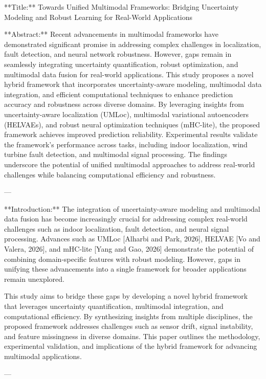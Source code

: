 **Title:**  
Towards Unified Multimodal Frameworks: Bridging Uncertainty Modeling and Robust Learning for Real-World Applications  

**Abstract:**  
Recent advancements in multimodal frameworks have demonstrated significant promise in addressing complex challenges in localization, fault detection, and neural network robustness. However, gaps remain in seamlessly integrating uncertainty quantification, robust optimization, and multimodal data fusion for real-world applications. This study proposes a novel hybrid framework that incorporates uncertainty-aware modeling, multimodal data integration, and efficient computational techniques to enhance prediction accuracy and robustness across diverse domains. By leveraging insights from uncertainty-aware localization (UMLoc), multimodal variational autoencoders (HELVAEs), and robust neural optimization techniques (mHC-lite), the proposed framework achieves improved prediction reliability. Experimental results validate the framework's performance across tasks, including indoor localization, wind turbine fault detection, and multimodal signal processing. The findings underscore the potential of unified multimodal approaches to address real-world challenges while balancing computational efficiency and robustness.  

---

**Introduction:**  
The integration of uncertainty-aware modeling and multimodal data fusion has become increasingly crucial for addressing complex real-world challenges such as indoor localization, fault detection, and neural signal processing. Advances such as UMLoc [Alharbi and Park, 2026], HELVAE [Vo and Valera, 2026], and mHC-lite [Yang and Gao, 2026] demonstrate the potential of combining domain-specific features with robust modeling. However, gaps in unifying these advancements into a single framework for broader applications remain unexplored.

This study aims to bridge these gaps by developing a novel hybrid framework that leverages uncertainty quantification, multimodal integration, and computational efficiency. By synthesizing insights from multiple disciplines, the proposed framework addresses challenges such as sensor drift, signal instability, and feature missingness in diverse domains. This paper outlines the methodology, experimental validation, and implications of the hybrid framework for advancing multimodal applications.  

---

